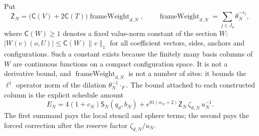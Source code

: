 Put
\[
 \mathsf Z_N=\bigl(\mathsf C(V)+2\mathsf C(T)\bigr)
                  \operatorname{frameWeight}_{d,N},
 \qquad
 \operatorname{frameWeight}_{d,N}=\sum_{j\in J_d}\theta_N^{-s_j},
\]
where $\mathsf C(W)\geq1$ denotes a fixed value-norm constant of the
section $W$: $|W(v)(o,U)|\leq\mathsf C(W)\|v\|_1$ for all coefficient
vectors, sides, anchors and configurations. Such a constant exists
because the finitely many basis columns of $W$ are continuous functions
on a compact configuration space. It is not a derivative bound, and
$\operatorname{frameWeight}_{d,N}$ is not a number of sites: it bounds the
$\ell^1$ operator norm of the dilation $\theta_N^{-1}\cdot_F$. The
bound attached to each constructed column is the explicit schedule amount
\[
 E_N=4(1+c_N)\mathsf S_N(q_d,b_N)
    +e^{81(\alpha_N+2)}\mathsf Z_N\,\zeta_{d,N}\,u_N^{-1}.
\]
The first summand pays the local stencil and sphere terms; the second
pays the forced correction after the reserve factor $\zeta_{d,N}/u_N$.

